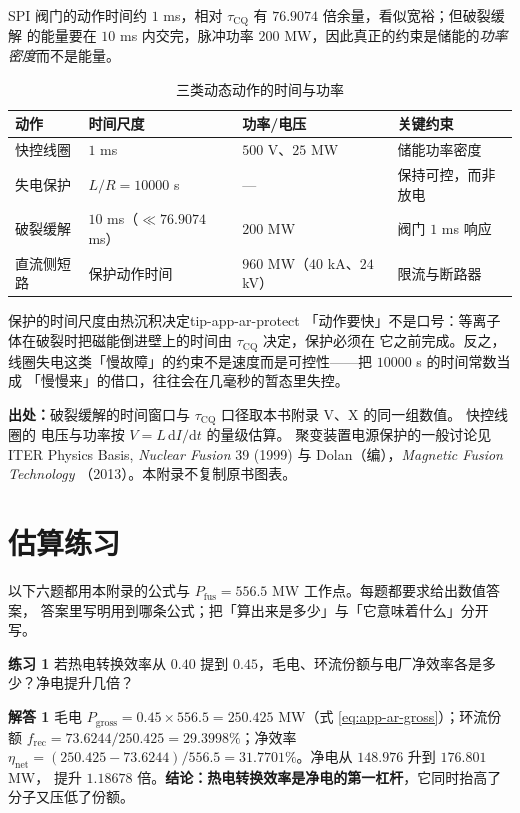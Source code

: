 SPI 阀门的动作时间约 $1$ ms，相对 $\tau_\mathrm{CQ}$ 有 $76.9074$ 倍余量，看似宽裕；但破裂缓解
的能量要在 $10$ ms 内交完，脉冲功率 $200$ MW，因此真正的约束是储能的\emph{功率密度}而不是能量。

\begin{table}[htbp]
\centering
\small
\caption{三类动态动作的时间与功率}
\label{tab:app-ar-protect}
\begin{tabular}{p{2.6cm}p{2.4cm}p{2.6cm}p{4.6cm}
}
\hline
动作 & 时间尺度 & 功率/电压 & 关键约束 \\
\hline
快控线圈 & $1$ ms & $500$ V、$25$ MW & 储能功率密度 \\
失电保护 & $L/R=10000$ s & --- & 保持可控，而非放电 \\
破裂缓解 & $10$ ms（$\ll76.9074$ ms） & $200$ MW & 阀门 $1$ ms 响应 \\
直流侧短路 & 保护动作时间 & $960$ MW（$40$ kA、$24$ kV） & 限流与断路器 \\
\hline
\end{tabular}
\end{table}

\begin{tip}{保护的时间尺度由热沉积决定}{tip-app-ar-protect}
「动作要快」不是口号：等离子体在破裂时把磁能倒进壁上的时间由 $\tau_\mathrm{CQ}$ 决定，保护必须在
它之前完成。反之，线圈失电这类「慢故障」的约束不是速度而是可控性——把 $10000$ s 的时间常数当成
「慢慢来」的借口，往往会在几毫秒的暂态里失控。
\end{tip}

{\small

\textbf{出处：}破裂缓解的时间窗口与 $\tau_\mathrm{CQ}$ 口径取本书附录 V、X 的同一组数值。
快控线圈的
电压与功率按 $V=L\,\mathrm{d}I/\mathrm{d}t$ 的量级估算。
聚变装置电源保护的一般讨论见 ITER
Physics Basis, \emph{Nuclear Fusion} 39 (1999) 与 Dolan（编），\emph{Magnetic Fusion Technology}
（2013）。本附录不复制原书图表。
}

\section{估算练习}
\label{sec:app-ar-problems}

以下六题都用本附录的公式与 $P_\mathrm{fus}=556.5$ MW 工作点。每题都要求给出数值答案，
答案里写明用到哪条公式；把「算出来是多少」与「它意味着什么」分开写。

\textbf{练习 1}
若热电转换效率从 $0.40$ 提到 $0.45$，毛电、环流份额与电厂净效率各是多少？净电提升几倍？

\textbf{解答 1}
毛电 $P_\mathrm{gross}=0.45\times556.5=250.425$ MW（式 \eqref{eq:app-ar-gross}）；环流份额
$f_\mathrm{rec}=73.6244/250.425=29.3998\%$；净效率
$\eta_\mathrm{net}=(250.425-73.6244)/556.5=31.7701\%$。净电从 $148.976$ 升到 $176.801$ MW，
提升 $1.18678$ 倍。\textbf{结论：热电转换效率是净电的第一杠杆}，它同时抬高了分子又压低了份额。

